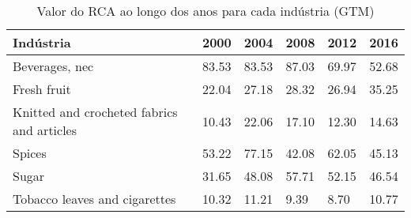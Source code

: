 \begin{table}
\centering
\caption{Valor do RCA ao longo dos anos para cada indústria (GTM)}
\begin{tabular}{p{6cm}p{1.5cm}p{1.5cm}p{1.5cm}p{1.5cm}p{1.5cm}}
\toprule
                                 Indústria &  2000 &  2004 &  2008 &  2012 &  2016 \\
\midrule
                            Beverages, nec & 83.53 & 83.53 & 87.03 & 69.97 & 52.68 \\
                               Fresh fruit & 22.04 & 27.18 & 28.32 & 26.94 & 35.25 \\
Knitted and crocheted fabrics and articles & 10.43 & 22.06 & 17.10 & 12.30 & 14.63 \\
                                    Spices & 53.22 & 77.15 & 42.08 & 62.05 & 45.13 \\
                                     Sugar & 31.65 & 48.08 & 57.71 & 52.15 & 46.54 \\
             Tobacco leaves and cigarettes & 10.32 & 11.21 &  9.39 &  8.70 & 10.77 \\
\bottomrule
\end{tabular}
\end{table}

